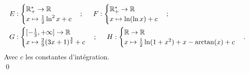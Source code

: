 \documentclass[10pt]{article}
\begin{document}
\begin{tcolorbox}[enhanced, width=7in, center, size=fbox, fontupper=\large, drop shadow southwest]
\begin{align*}
        &E:\begin{cases}\mathbb{R_+^*}\rightarrow\mathbb{R}\\x\mapsto\frac{1}{2}\ln^2x + c\end{cases}; \hspace{0.5cm} F:\begin{cases}\mathbb{R_+^*}\rightarrow\mathbb{R}\\x\mapsto\ln(\ln x) + c\end{cases};\\
        &G:\begin{cases}[-\frac{1}{3}, +\infty]\rightarrow\mathbb{R}\\x\mapsto\frac{2}{9}(3x+1)^{\frac{3}{2}} + c\end{cases}; \hspace{0.5cm}H:\begin{cases}\mathbb{R}\rightarrow\mathbb{R}\\x\mapsto\frac{1}{2}\ln(1+x^2) + x - \arctan(x) + c\end{cases}.
    \end{align*}
    Avec $c$ les constantes d'intégration.\\
    \qed
\end{tcolorbox}

\end{document}
